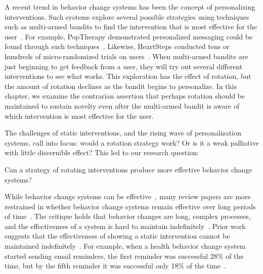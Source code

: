 A recent trend in behavior change systems has been the concept of personalizing interventions. Such systems explore several possible strategies using techniques such as multi-armed bandits to find the intervention that is most effective for the user~\cite{paredes2014poptherapy, rabbi2014automated}. For example, PopTherapy demonstrated personalized messaging could be found through such techniques~\cite{paredes2014poptherapy}. Likewise, HeartSteps conducted tens or hundreds of micro-randomized trials on users~\cite{doi:10.1111/j.1740-9713.2015.00863.x}.  When multi-armed bandits are just beginning to get feedback from a user, they will try out several different interventions to see what works. This exploration has the effect of rotation, but the amount of rotation declines as the bandit begins to personalize. In this chapter, we examine the contrarian assertion that perhaps rotation should be maintained to sustain novelty even after the multi-armed bandit is aware of which intervention is most effective for the user.

The challenges of static interventions, and the rising wave of personalization systems, call into focus: would a rotation strategy work? Or is it a weak palliative with little discernible effect? This led to our research question:

\begin{resques}[RQ]
Can a strategy of rotating interventions produce more effective behavior change systems?
\end{resques}


While behavior change systems can be effective~\cite{doi:10.1080/15228830802094429, Cuijpers2008, info:doi/10.2196/jmir.1376}, many review papers are more restrained in whether behavior change systems remain effective over long periods of time~\cite{doi:10.1111/j.1467-789X.2009.00646.x, 10.1371/journal.pmed.1000387, NORMAN2007336, 10.1007/978-3-319-07127-5_11}. The critique holds that behavior changes are long, complex processes, and the effectiveness of a system is hard to maintain indefinitely~\cite{prochaska1997transtheoretical}. Prior work suggests that the effectiveness of showing a static intervention cannot be maintained indefinitely~\cite{Hiniker:2016:MDE:2858036.2858403, riekert2013handbook}. For example, when a health behavior change system started sending email reminders, the first reminder was successful 28\% of the time, but by the fifth reminder it was successful only 18\% of the time~\cite{kaptein2015personalizing}. 

